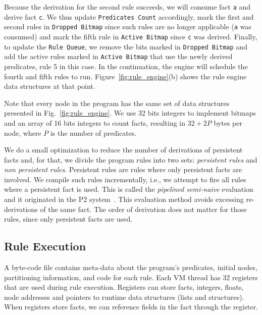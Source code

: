 Because the derivation for the second rule succeeds, we will consume
fact \texttt{a} and derive fact \texttt{c}. We thus update
\texttt{Predicates Count} accordingly, mark the first 
and second rules in \texttt{Dropped Bitmap} since such rules are no
longer applicable (\texttt{a} was consumed) and mark the fifth rule
in \texttt{Active Bitmap} since \texttt{c} was derived. Finally, to
update the \texttt{Rule Queue}, we remove the bits marked
in \texttt{Dropped Bitmap} and add the active rules marked
in \texttt{Active Bitmap} that use the newly derived predicates, rule
5 in this case. In the continuation, the engine will schedule the
fourth and fifth rules to run. Figure~\ref{fig:rule_engine}(b) shows
the rule engine data structures at that point.

Note that every node in the program has the same set of data
structures presented in Fig.~\ref{fig:rule_engine}. We use 32 bits
integers to implement bitmaps and an array of 16 bits integers to
count facts, resulting in $32 + 2P$ bytes per node, where $P$ is the
number of predicates.

We do a small optimization to reduce the number of derivations of
persistent facts and, for that, we divide the program rules into two
sets: \emph{persistent rules} and \emph{non persistent rules}.
Persistent rules are rules where only persistent facts are
involved. We compile such rules incrementally, i.e., we attempt to
fire all rules where a persistent fact is used. This is called
the \emph{pipelined semi-naive} evaluation and it originated in the P2
system~\cite{Loo-condie-garofalakis-p2}. This evaluation method avoids
excessing re-derivations of the same fact. The order of derivation
does not matter for those rules, since only persistent facts are used.


\subsection{Rule Execution}

A byte-code file contains meta-data about the program's predicates,
initial nodes, partitioning information, and code for each rule. Each
VM thread has 32 registers that are used during rule
execution. Registers can store facts, integers, floats, node addresses
and pointers to runtime data structures (lists and structures). When
registers store facts, we can reference fields in the fact through the
register.

